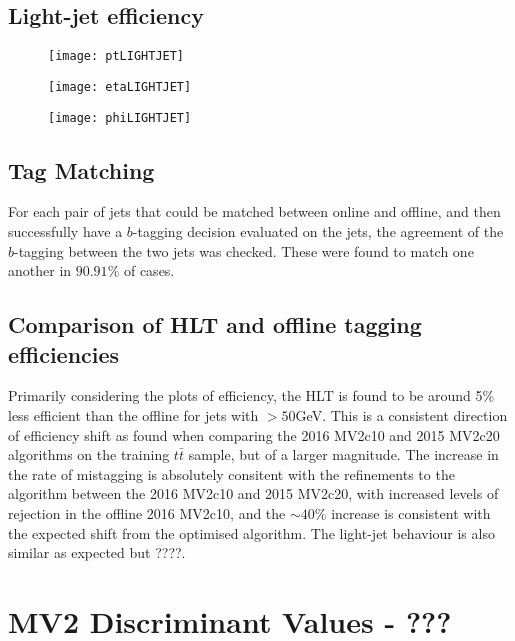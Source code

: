	\newpage
	\subsection{Light-jet efficiency}

		\begin{figure}[h]
			\centering
			\begin{minipage}[h]{0.31\linewidth}
				\texttt{[image: ptLIGHTJET]}

			\end{minipage}
			\quad
			\begin{minipage}[h]{0.31\linewidth}
				\texttt{[image: etaLIGHTJET]}
			\end{minipage}
			\quad
			\begin{minipage}[h]{0.31\linewidth}
				\texttt{[image: phiLIGHTJET]}
			\end{minipage}
			\caption{ }
			\label{fig:MC:lightjetefficiency}
		\end{figure}


	\subsection{Tag Matching}

	For each pair of jets that could be matched between online and offline, and then successfully have a $b$-tagging decision evaluated on the jets, the agreement of the $b$-tagging between the two jets was checked. These were found to match one another in $90.91\%$ of cases.

	\subsection{Comparison of HLT and offline tagging efficiencies}

		Primarily considering the \pt plots of efficiency, the HLT \btag is found to be around 5\% less efficient than the offline \btag for jets with \pt$>50$GeV. This is a consistent direction of efficiency shift as found when comparing the 2016 MV2c10 and 2015 MV2c20 algorithms on the training $t\bar{t}$ sample, but of a larger magnitude. The increase in the rate of \cjet mistagging is absolutely consitent with the refinements to the algorithm between the 2016 MV2c10 and 2015 MV2c20, with increased levels of \cjet rejection in the offline 2016 MV2c10, and the $\sim40$\% increase is consistent with the expected shift from the optimised algorithm. \cite{btagOptimisation} The light-jet behaviour is also similar as expected but ????. 


	\section{MV2 Discriminant Values - ???} 




\endinput
